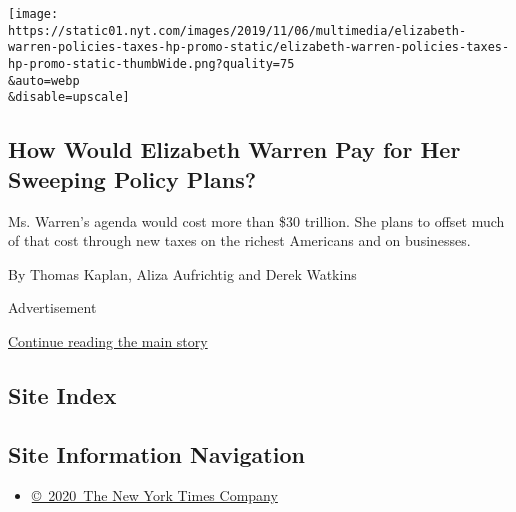 \begin{enumerate}
  \texttt{[image: https://static01.nyt.com/images/2019/11/06/multimedia/elizabeth-warren-policies-taxes-hp-promo-static/elizabeth-warren-policies-taxes-hp-promo-static-thumbWide.png?quality=75\\\&auto=webp\\\&disable=upscale]}

  \hypertarget{how-would-elizabeth-warren-pay-for-her-sweeping-policy-plans}{%
  \subsection{How Would Elizabeth Warren Pay for Her Sweeping Policy
  Plans?}\label{how-would-elizabeth-warren-pay-for-her-sweeping-policy-plans}}

  Ms. Warren's agenda would cost more than \$30 trillion. She plans to
  offset much of that cost through new taxes on the richest Americans
  and on businesses.

  By Thomas Kaplan, Aliza Aufrichtig and Derek Watkins
\end{enumerate}

Advertisement

\protect\hyperlink{after-mid2}{Continue reading the main story}

\hypertarget{site-index}{%
\subsection{Site Index}\label{site-index}}

\hypertarget{site-information-navigation}{%
\subsection{Site Information
Navigation}\label{site-information-navigation}}

\begin{itemize}
\tightlist
\item
  \href{https://help.nytimes.com/hc/en-us/articles/115014792127-Copyright-notice}{©~2020~The
  New York Times Company}
\end{itemize}

